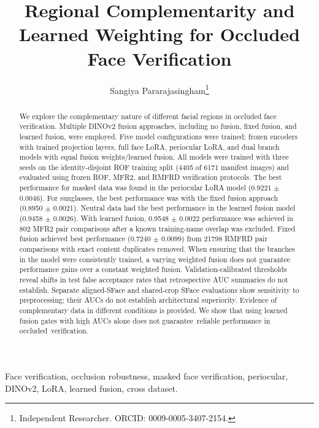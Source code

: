 \documentclass[10pt,lettersize,journal]{IEEEtran}
\title{Regional Complementarity and Learned Weighting for Occluded Face Verification}
\author{Sangiya Pararajasingham\thanks{Independent Researcher. ORCID: 0009-0005-3407-2154.}}
\begin{document}
\maketitle
\begin{abstract}
We explore the complementary nature of different facial regions in occluded face verification. Multiple DINOv2 fusion approaches, including no fusion, fixed fusion, and learned fusion, were employed. Five model configurations were trained; frozen encoders with trained projection layers, full face LoRA, periocular LoRA, and dual branch models with equal fusion weights/learned fusion. All models were trained with three seeds on the identity-disjoint ROF training split (4405 of 6171 manifest images) and evaluated using frozen ROF, MFR2, and RMFRD verification protocols. The best performance for masked data was found in the periocular LoRA model (0.9221 \ensuremath{\pm} 0.0046). For sunglasses, the best performance was with the fixed fusion approach (0.8950 \ensuremath{\pm} 0.0021). Neutral data had the best performance in the learned fusion model (0.9458 \ensuremath{\pm} 0.0026). With learned fusion, 0.9548 \ensuremath{\pm} 0.0022 performance was achieved in 802 MFR2 pair comparisons after a known training-name overlap was excluded. Fixed fusion achieved best performance (0.7240 \ensuremath{\pm} 0.0099) from 21798 RMFRD pair comparisons with exact content duplicates removed. When ensuring that the branches in the model were consistently trained, a varying weighted fusion does not guarantee performance gains over a constant weighted fusion. Validation-calibrated thresholds reveal shifts in test false acceptance rates that retrospective AUC summaries do not establish. Separate aligned-SFace and shared-crop SFace evaluations show sensitivity to preprocessing; their AUCs do not establish architectural superiority. Evidence of complementary data in different conditions is provided. We show that using learned fusion gates with high AUCs alone does not guarantee~reliable performance in \mbox{occluded verification}.\par
\end{abstract}
\begin{IEEEkeywords}
Face verification, occlusion robustness, masked face verification, periocular, DINOv2, LoRA, learned fusion, cross dataset.\par
\end{IEEEkeywords}
\end{document}
